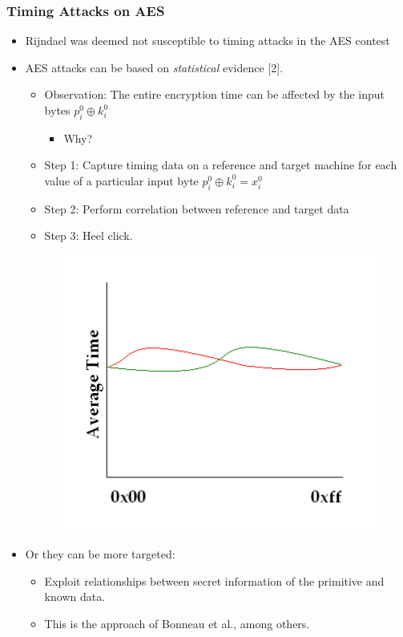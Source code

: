 \documentclass[9pt,handout]{beamer}
\begin{document}
\begin{frame}
	\frametitle{Timing Attacks on AES}
	\begin{itemize}
		\item Rijndael was deemed not susceptible to timing attacks in the AES contest
		\item AES attacks can be based on \emph{statistical} evidence [2].
		\begin{itemize}
			\item Observation: The entire encryption time can be affected by the input bytes $p_i^0 \oplus k_i^0$
			\begin{itemize}
				\item Why? %
			\end{itemize}
			\item Step 1: Capture timing data on a reference and target machine for each value of a particular input byte $p_i^0 \oplus k_i^0 = x_i^0$
			\item Step 2: Perform correlation between reference and target data
			\item Step 3: Heel click.
		\end{itemize}
\vspace{-1em}
\begin{figure}
\centering
\includegraphics[scale = 0.35]{images/bernstein.png}
\end{figure}

		\item Or they can be more targeted:
		\begin{itemize}
			\item Exploit relationships between secret information of the primitive and known data.
			\item This is the approach of Bonneau et al., among others.
		\end{itemize}
	\end{itemize}
\end{frame}
\end{document}
